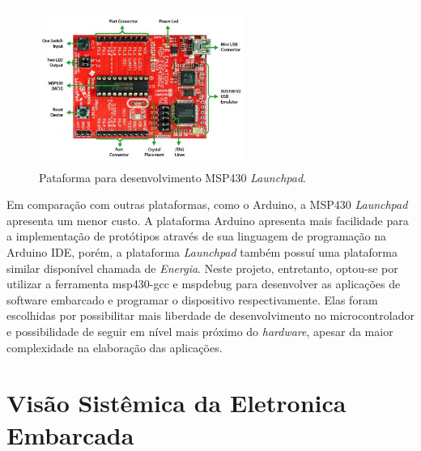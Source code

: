 \begin{figure}[h]
  \centering
  \includegraphics[width=0.6\textwidth]
      {figuras/Launchpad.jpg}
  \caption{Pataforma para desenvolvimento MSP430 \textit{Launchpad}.}
  \label{Launchpad}
\end{figure}
Em comparação com outras plataformas, como o Arduino, a MSP430 \textit{Launchpad} apresenta um menor custo. A plataforma Arduino apresenta mais facilidade para a implementação de protótipos através de sua linguagem de programação na Arduino IDE, porém, a plataforma \textit{Launchpad} também possuí uma plataforma similar disponível chamada de \textit{Energia}. Neste projeto, entretanto, optou-se por utilizar a ferramenta msp430-gcc e mspdebug para desenvolver as aplicações de software embarcado e programar o dispositivo respectivamente. Elas foram escolhidas por possibilitar mais liberdade de desenvolvimento no microcontrolador e possibilidade de seguir em nível mais próximo do \textit{hardware}, apesar da maior complexidade na elaboração das aplicações.





\section{Visão Sistêmica da Eletronica Embarcada} %
\label{sec:visao_sistemica}


